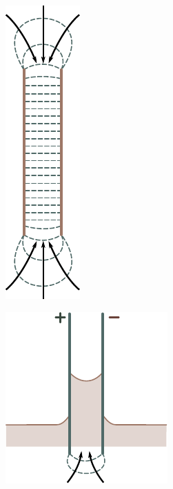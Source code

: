 \begin{figure}[!htb]
	\begin{minipage}[t]{0.48\linewidth}
		\begin{center}
			\includegraphics[scale=1]{figures/ch_04/fig_4_2.pdf}
			\caption[]{}
			\label{fig:4_2}
		\end{center}
	\end{minipage}
	\hfill{ }%
	\begin{minipage}[t]{0.48\linewidth}
		\begin{center}
			\includegraphics[scale=1]{figures/ch_04/fig_4_3.pdf}
			\caption[]{}
			\label{fig:4_3}
		\end{center}
	\end{minipage}
\vspace{-0.4cm}
\end{figure}

